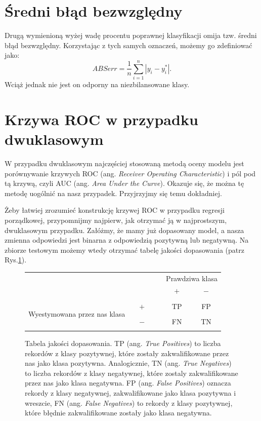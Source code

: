\documentclass{mini}
\begin{document}
\section{Średni błąd bezwzględny}

Drugą wymienioną wyżej wadę procentu poprawnej klasyfikacji omija tzw. średni błąd bezwzględny. Korzystając z tych samych oznaczeń, możemy go zdefiniować jako:
\begin{equation}\label{dop2}
ABSerr = \frac{1}{n}\sum_{i=1}^n | y_i - y^\ast_i |. 
\end{equation}
Wciąż jednak nie jest on odporny na niezbilansowane klasy. 

\section{Krzywa ROC w przypadku dwuklasowym}

W przypadku dwuklasowym najczęściej stosowaną metodą oceny modelu jest porównywanie krzywych ROC (ang. \textit{Receiver Operating Characteristic}) i pól pod tą krzywą, czyli AUC (ang. \textit{Area Under the Curve}). Okazuje się, że można tę metodę uogólnić na nasz przypadek. Przyjrzyjmy się temu dokładniej. 

Żeby łatwiej zrozumieć konstrukcję krzywej ROC w przypadku regresji porządkowej, przypomnijmy najpierw, jak otrzymać ją w najprostszym, dwuklasowym przypadku. Załóżmy, że mamy już dopasowany model, a nasza zmienna odpowiedzi jest binarna z odpowiedzią pozytywną lub negatywną. Na zbiorze testowym możemy wtedy otrzymać tabelę jakości dopasowania (patrz Rys.\ref{tabeladopasowania}).

\begin{figure}[h]
		\begin{center}
		\begin{tabular}{c c c c | | c c c} 
			& & & & & \multicolumn{2}{c}{ Prawdziwa klasa}\\ 
			& & & & & $+$ & $-$ \\
			\hline
			\hline
			& & & & & & \\
			\multirow{3}{*}{\parbox{4cm}{\centering  Wyestymowana przez nas klasa}}
			& & $+$ & & & TP & FP\\
			& & & & &\\
			& & $-$ & & & FN & TN\\
			& & & & & &
		\end{tabular}
		\end{center}
	\caption{Tabela jakości dopasowania. TP (ang. \textit{True Positives}) to liczba rekordów z klasy pozytywnej, które zostały zakwalifikowane przez nas jako klasa pozytywna. Analogicznie, TN (ang. \textit{True Negatives}) to liczba rekordów z klasy negatywnej, które zostaly zakwalifikowane przez nas jako klasa negatywna. FP (ang. \textit{False Positives}) oznacza rekordy z klasy negatywnej, zakwalifikowane jako klasa pozytywna i wreszcie, FN (ang. \textit{False Negatives}) to rekordy z klasy pozytywnej, które błędnie zakwalifikowane zostały jako klasa negatywna.}
\label{tabeladopasowania}	
\end{figure}
\newpage
\vfill
\end{document}

